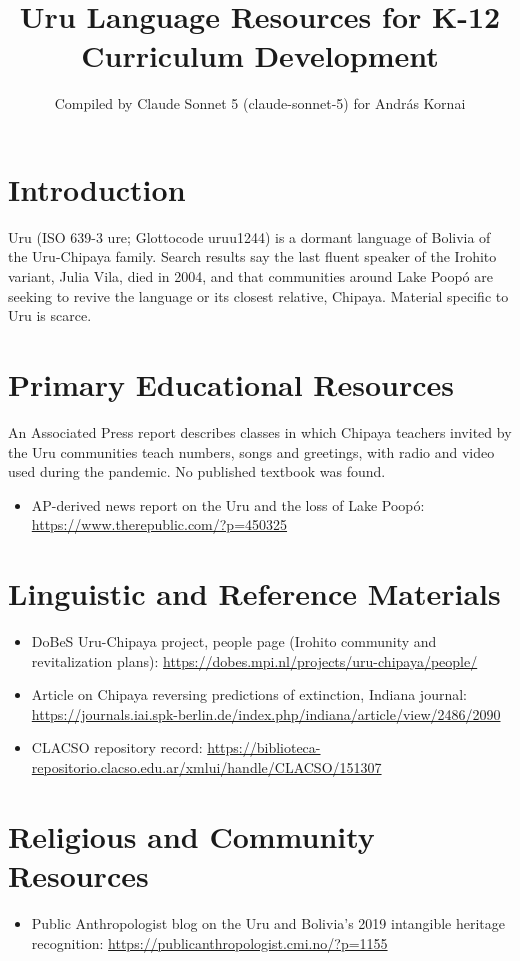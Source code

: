 \documentclass[12pt]{article}
\title{Uru Language Resources for K-12 Curriculum Development}
\author{Compiled by Claude Sonnet 5 (claude-sonnet-5) for Andr\'as Kornai}
\date{}
\begin{document}
\maketitle
\section{Introduction}
Uru (ISO 639-3 ure; Glottocode uruu1244) is a dormant language of Bolivia of the Uru-Chipaya family. Search results say the last fluent speaker of the Irohito variant, Julia Vila, died in 2004, and that communities around Lake Poop\'o are seeking to revive the language or its closest relative, Chipaya. Material specific to Uru is scarce.
\section{Primary Educational Resources}
An Associated Press report describes classes in which Chipaya teachers invited by the Uru communities teach numbers, songs and greetings, with radio and video used during the pandemic. No published textbook was found.
\begin{itemize}
\item AP-derived news report on the Uru and the loss of Lake Poop\'o: \url{https://www.therepublic.com/?p=450325}
\end{itemize}
\section{Linguistic and Reference Materials}
\begin{itemize}
\item DoBeS Uru-Chipaya project, people page (Irohito community and revitalization plans): \url{https://dobes.mpi.nl/projects/uru-chipaya/people/}
\item Article on Chipaya reversing predictions of extinction, Indiana journal: \url{https://journals.iai.spk-berlin.de/index.php/indiana/article/view/2486/2090}
\item CLACSO repository record: \url{https://biblioteca-repositorio.clacso.edu.ar/xmlui/handle/CLACSO/151307}
\end{itemize}
\section{Religious and Community Resources}
\begin{itemize}
\item Public Anthropologist blog on the Uru and Bolivia's 2019 intangible heritage recognition: \url{https://publicanthropologist.cmi.no/?p=1155}
\end{itemize}
\end{document}
